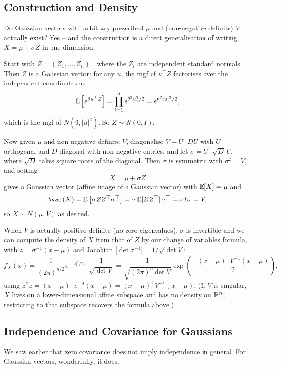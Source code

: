 \documentclass[a4paper]{scrartcl}
\begin{document}
\subsection{Construction and Density}

Do Gaussian vectors with arbitrary prescribed $\mu$ and (non-negative definite) $V$ actually exist? Yes -- and the construction is a direct generalisation of writing $X = \mu + \sigma Z$ in one dimension.

Start with $Z = (Z_1, \dots, Z_n)^\top$ where the $Z_i$ are independent standard normals. Then $Z$ is a Gaussian vector: for any $u$, the mgf of $u^\top Z$ factorises over the independent coordinates as
$$
\mathbb{E}\left[e^{\theta u^\top Z}\right] = \prod_{i = 1}^{n} e^{\theta^2 u_i^2 / 2} = e^{\theta^2 |u|^2/2},
$$
which is the mgf of $N(0, |u|^2)$. So $Z \sim N(0, I)$.

Now given $\mu$ and non-negative definite $V$, diagonalise $V = U^\top D U$ with $U$ orthogonal and $D$ diagonal with non-negative entries, and let $\sigma = U^\top \sqrt{D}\, U$, where $\sqrt{D}$ takes square roots of the diagonal. Then $\sigma$ is symmetric with $\sigma^2 = V$, and setting
$$
X = \mu + \sigma Z
$$
gives a Gaussian vector (affine image of a Gaussian vector) with $\mathbb{E}[X] = \mu$ and
$$
\var(X) = \EE\left[\sigma Z Z^\top \sigma^\top\right] = \sigma\, \EE[ZZ^\top]\, \sigma^\top = \sigma I \sigma = V,
$$
so $X \sim N(\mu, V)$ as desired.

When $V$ is actually positive definite (no zero eigenvalues), $\sigma$ is invertible and we can compute the density of $X$ from that of $Z$ by our change of variables formula, with $z = \sigma^{-1}(x - \mu)$ and Jacobian $|\det \sigma^{-1}| = 1/\sqrt{\det V}$:
$$
f_X(x) = \frac{1}{(2\pi)^{n/2}}e^{-|z|^2/2}\cdot\frac{1}{\sqrt{\det V}} = \frac{1}{\sqrt{(2\pi)^n \det V}}\exp\left(-\frac{(x - \mu)^\top V^{-1}(x - \mu)}{2}\right),
$$
using $z^\top z = (x - \mu)^\top \sigma^{-2}(x - \mu) = (x - \mu)^\top V^{-1}(x-\mu)$. (If $V$ is singular, $X$ lives on a lower-dimensional affine subspace and has no density on $\mathbb{R}^n$; restricting to that subspace recovers the formula above.)

\subsection{Independence and Covariance for Gaussians}

We saw earlier that zero covariance does not imply independence in general. For Gaussian vectors, wonderfully, it does.
\end{document}
